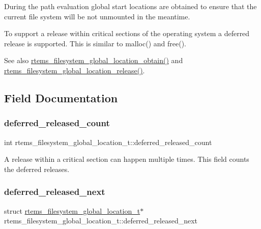 During the path evaluation global start locations are obtained to ensure that the current file system will be not unmounted in the meantime.

To support a release within critical sections of the operating system a deferred release is supported. This is similar to malloc() and free().

\begin{DoxySeeAlso}{See also}
\mbox{\hyperlink{group__LibIOInternal_ga3df19d6d5f1f73b574478e7c4b42e643}{rtems\+\_\+filesystem\+\_\+global\+\_\+location\+\_\+obtain()}} and \mbox{\hyperlink{group__LibIOInternal_ga66aa5e6d0bbf4c03b533deac66fb328f}{rtems\+\_\+filesystem\+\_\+global\+\_\+location\+\_\+release()}}. 
\end{DoxySeeAlso}


\subsection{Field Documentation}
\mbox{\label{structrtems__filesystem__global__location__t_adee2683dd338a69847b0a5bd3ee12882}} 
\subsubsection{\texorpdfstring{deferred\_released\_count}{deferred\_released\_count}}
{\footnotesize\ttfamily int rtems\+\_\+filesystem\+\_\+global\+\_\+location\+\_\+t\+::deferred\+\_\+released\+\_\+count}

A release within a critical section can happen multiple times. This field counts the deferred releases. \mbox{\label{structrtems__filesystem__global__location__t_adc7c86bee7c1adeafb587459ce6afbd5}} 
\subsubsection{\texorpdfstring{deferred\_released\_next}{deferred\_released\_next}}
{\footnotesize\ttfamily struct \mbox{\hyperlink{structrtems__filesystem__global__location__t}{rtems\+\_\+filesystem\+\_\+global\+\_\+location\+\_\+t}}$\ast$ rtems\+\_\+filesystem\+\_\+global\+\_\+location\+\_\+t\+::deferred\+\_\+released\+\_\+next}

